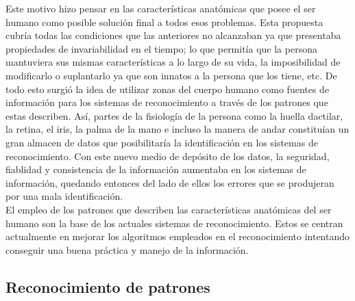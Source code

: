 Este motivo hizo pensar en las características anatómicas que posee el ser humano como posible solución final a todos esos problemas. Esta propuesta cubría todas las condiciones que las anteriores no alcanzaban ya que presentaba propiedades de invariabilidad en el tiempo; lo que permitía que la persona mantuviera sus mismas características a lo largo de su vida, la imposibilidad de modificarlo o suplantarlo ya que son innatos a la persona que los tiene, etc. De todo esto surgió la idea de utilizar zonas del cuerpo humano como fuentes de información para los sistemas de reconocimiento a través de los patrones que estas describen. Así, partes de la fisiología de la persona como la huella dactilar, la retina, el iris, la palma de la mano e incluso la manera de andar constituían un gran almacen de datos que posibilitaría la identificación en los sistemas de reconocimiento. Con este nuevo medio de depósito de los datos, la seguridad, fiablidad y consistencia de la información aumentaba en los sistemas de información, quedando entonces del lado de ellos los errores que se produjeran por una mala identificación.  \\

El empleo de los patrones que describen las características anatómicas del ser humano son la base de los actuales sistemas de reconocimiento. Estos se centran actualmente en mejorar los algoritmos empleados en el reconocimiento intentando conseguir una buena práctica y manejo de la información.   \\


\subsection{Reconocimiento de patrones}

